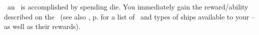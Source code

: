 \activating\ an \armament\ is accomplished by spending die.
You immediately gain the reward/ability described on the \planetsheet\ (see also , p.\pageref{sec:armaments} for a list of \armaments\ and types of ships available to your \armaments--as well as their rewards).

